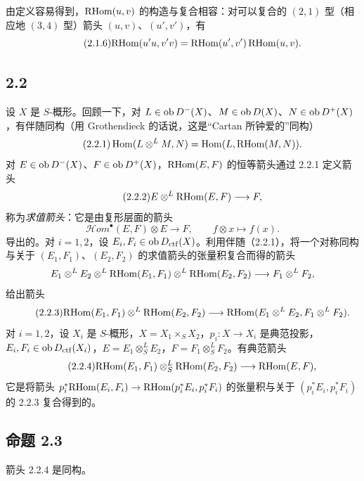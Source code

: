 由定义容易得到，$\mathrm{RHom}(u,v)$ 的构造与复合相容：对可以复合的 $(2,1)$ 型（相应地 $(3,4)$ 型）箭头 $(u,v)$、$(u',v')$，有
\begin{equation}\tag{2.1.6}
\mathrm{RHom}(u'u,v'v)=\mathrm{RHom}(u',v')\,\mathrm{RHom}(u,v).
\end{equation}

\subsection*{2.2}
设 $X$ 是 $S$-概形。回顾一下，对 $L\in\operatorname{ob} D^{-}(X)$、$M\in\operatorname{ob} D(X)$、$N\in\operatorname{ob} D^{+}(X)$，有伴随同构（用 Grothendieck 的话说，这是“Cartan 所钟爱的”同构）
\begin{equation}\tag{2.2.1}
\operatorname{Hom}(L\otimes^{L}M,N)=\operatorname{Hom}(L,\mathrm{RHom}(M,N)).
\end{equation}
对 $E\in\operatorname{ob} D^{-}(X)$、$F\in\operatorname{ob} D^{+}(X)$，$\mathrm{RHom}(E,F)$ 的恒等箭头通过 2.2.1 定义箭头
\begin{equation}\tag{2.2.2}
E\otimes^{L}\mathrm{RHom}(E,F)\longrightarrow F,
\end{equation}
称为\emph{求值箭头}：它是由复形层面的箭头
\[
\mathcal Hom^{\bullet}(E,F)\otimes E\longrightarrow F,
\qquad f\otimes x\longmapsto f(x).
\]
导出的。对 $i=1,2$，设 $E_i,F_i\in\operatorname{ob} D_{\mathrm{ctf}}(X)$。利用伴随（2.2.1），将一个对称同构与关于 $(E_1,F_1)$、$(E_2,F_2)$ 的求值箭头的张量积复合而得的箭头
\[
E_1\otimes^{L}E_2\otimes^{L}\mathrm{RHom}(E_1,F_1)\otimes^{L}\mathrm{RHom}(E_2,F_2)\longrightarrow F_1\otimes^{L}F_2,
\]
给出箭头
\begin{equation}\tag{2.2.3}
\mathrm{RHom}(E_1,F_1)\otimes^{L}\mathrm{RHom}(E_2,F_2)\longrightarrow\mathrm{RHom}(E_1\otimes^{L}E_2,F_1\otimes^{L}F_2).
\end{equation}
对 $i=1,2$，设 $X_i$ 是 $S$-概形，$X=X_1\times_SX_2$，$p_i:X\to X_i$ 是典范投影，$E_i,F_i\in\operatorname{ob} D_{\mathrm{ctf}}(X_i)$，$E=E_1\otimes^{L}_{S}E_2$，$F=F_1\otimes^{L}_{S}F_2$。有典范箭头
\begin{equation}\tag{2.2.4}
\mathrm{RHom}(E_1,F_1)\otimes^{L}_{S}\mathrm{RHom}(E_2,F_2)\longrightarrow\mathrm{RHom}(E,F),
\end{equation}
它是将箭头 $p_i^{*}\mathrm{RHom}(E_i,F_i)\to\mathrm{RHom}(p_i^{*}E_i,p_i^{*}F_i)$ 的张量积与关于 $(p_i^{*}E_i,p_i^{*}F_i)$ 的 2.2.3 复合得到的。

\subsection*{命题 2.3}
箭头 2.2.4 是同构。

